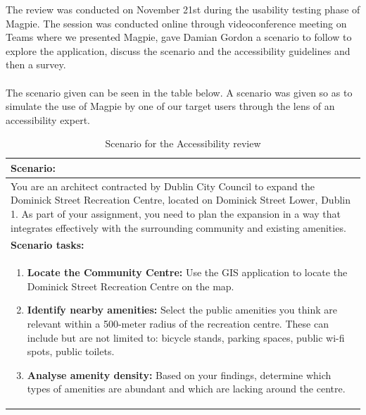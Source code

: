 \noindent The review was conducted on November 21st during the usability testing phase of Magpie. The session was conducted online through videoconference meeting on Teams where we presented Magpie, gave Damian Gordon a scenario to follow to explore the application, discuss the scenario and the accessibility guidelines and then a survey.\\\\
The scenario given can be seen in the table below. A scenario was given so as to simulate the use of Magpie by one of our target users through the lens of an accessibility expert.\\
\begin{table}[h!]
    \centering
    \caption{Scenario for the Accessibility review}
    \begin{tabular}{|p{}|}
        \hline
        \textbf{Scenario:}                                                                                                                                                                                                                                                                                         \\
        \hline
        You are an architect contracted by Dublin City Council to expand the Dominick Street Recreation Centre, located on Dominick Street Lower, Dublin 1. As part of your assignment, you need to plan the expansion in a way that integrates effectively with the surrounding community and existing amenities. \\
        \hline
        \textbf{Scenario tasks:}                                                                                                                                                                                                                                                                                   \\
        \hline
        \begin{enumerate}
            \item \textbf{Locate the Community Centre:} Use the GIS application to locate the Dominick Street Recreation Centre on the map.
            \item \textbf{Identify nearby amenities:} Select the public amenities you think are relevant within a 500-meter radius of the recreation centre. These can include but are not limited to: bicycle stands, parking spaces, public wi-fi spots, public toilets.
            \item \textbf{Analyse amenity density:} Based on your findings, determine which types of amenities are abundant and which are lacking around the centre.

\end{enumerate}
\end{tabular}
\end{table}
